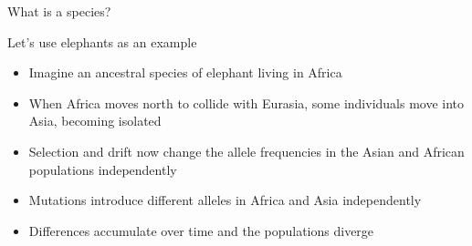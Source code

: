 \documentclass[14pt,table]{beamer}
\begin{document}
\begin{frame}
\begin{adjustwidth}{-1.5em}{-1.5em}
    What is a species?

    \vspace{1cm}
\end{adjustwidth}
\end{frame}

\begin{frame}
\begin{adjustwidth}{-1.5em}{-1.5em}
    Let's use elephants as an example
    \begin{itemize}
        \item<2-> Imagine an ancestral species of elephant living in Africa
        \item<3-> When Africa moves north to collide with Eurasia, some
            individuals move into Asia, becoming isolated
        \item<4-> Selection and drift now change the allele frequencies in the
            Asian and African populations independently
        \item<5-> Mutations introduce different alleles in Africa and Asia
            independently
        \item<6-> Differences accumulate over time and the populations diverge

    \end{itemize}
\end{adjustwidth}
\end{frame}



\end{document}
